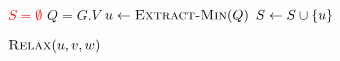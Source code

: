 
\begin{algorithm}[H]
  \begin{algorithmic}[1]
      \State {}

      \hStatex
      \State \textcolor<3->{red}{$S = \emptyset$}
      \State $Q = G.V$
	\State $u \gets \Call{Extract-Min}{Q}$
	\State \textcolor<3->{red}{$S \gets S \cup \left\{u\right\}$}

	\hStatex
	  \State $\Call{Relax}{u,v,w}$
	\EndFor
      \EndWhile
    \EndProcedure
  \end{algorithmic}
\end{algorithm}
